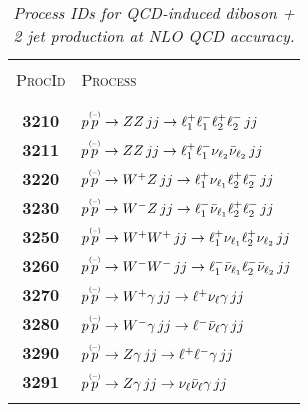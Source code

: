 \documentclass[english,12pt]{article}
\begin{document}
\begin{table}[t!]
\newcommand{\lstrut}{{$\strut\atop\strut$}}
\begin{center}
\small
\begin{tabular}{c|l}
\hline
&\\
\textsc{ProcId} & \textsc{Process}\\
&\\
\hline
&\\
\bf 3210 & $p \overset{\mbox{\tiny{(--)}}}{p} \to ZZ \,  jj\to \ell_{1}^{+} \ell_{1}^{-} \ell_{2}^{+} \ell_{2}^{-} \, jj$  \\
\bf 3211 & $p \overset{\mbox{\tiny{(--)}}}{p} \to ZZ \,  jj\to \ell_{1}^{+} \ell_{1}^{-} \nu_{\ell_{2}} \bar{\nu}_{\ell_{2}} \, jj$  \\
\bf 3220 & $p \overset{\mbox{\tiny{(--)}}}{p} \to W^{+}Z \,  jj\to \ell_{1}^{+} \nu_{\ell_{1}} \ell_{2}^{+} \ell_{2}^{-} \, jj$  \\
\bf 3230 & $p \overset{\mbox{\tiny{(--)}}}{p} \to W^{-}Z \, jj\to \ell_{1}^{-} \bar{\nu}_{\ell _{1}} \ell_{2}^{+} \ell_{2}^{-} \, jj$  \\
\bf 3250 & $p \overset{\mbox{\tiny{(--)}}}{p} \to W^{+}W^{+} \,  jj\to \ell_{1}^{+} \nu_{\ell_{1}} \ell_{2}^{+} \nu_{\ell_{2}} \, jj$ \\
\bf 3260 & $p \overset{\mbox{\tiny{(--)}}}{p} \to W^{-}W^{-} \,  jj\to \ell_{1}^{-} \bar{\nu}_{\ell_{1}} \ell_{2}^{-} \bar{\nu}_{\ell_{2}} \, jj$ \\
\bf 3270 & $p \overset{\mbox{\tiny{(--)}}}{p} \to W^{+}\gamma \,  jj\to \ell^{+} \nu_{\ell} \gamma \, jj$  \\
\bf 3280 & $p \overset{\mbox{\tiny{(--)}}}{p} \to W^{-}\gamma \, jj\to \ell^{-} \bar{\nu}_{\ell} \gamma \, jj$  \\
\bf 3290 & $p \overset{\mbox{\tiny{(--)}}}{p} \to Z\gamma \,  jj\to \ell^{+} \ell^{-} \gamma \, jj$  \\
\bf 3291 & $p \overset{\mbox{\tiny{(--)}}}{p} \to Z\gamma \,  jj\to \nu_{\ell} \bar{\nu}_{\ell} \gamma\, jj$  \\
&\\
\hline
\end{tabular}
\caption {\em  Process IDs for QCD-induced diboson + 2 jet
production at NLO QCD accuracy.}
\vspace{0.2cm}
\label{tab:qcdvvjj}
\end{center}
\end{table}


%
\end{document}
